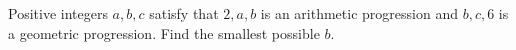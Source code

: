 Positive integers $a,b,c$ satisfy that $2,a,b$ is an arithmetic progression and $b,c,6$ is a geometric progression. Find the smallest possible $b$.
